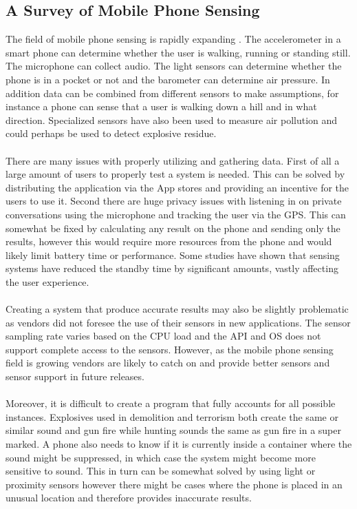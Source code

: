 \subsection{A Survey of Mobile Phone Sensing}

The field of mobile phone sensing is rapidly expanding \cite{mobsurv}. The accelerometer in a smart phone can determine whether the user is walking, running or standing still. The microphone can collect audio. The light sensors can determine whether the phone is in a pocket or not and the barometer can determine air pressure. In addition data can be combined from different sensors to make assumptions, for instance a phone can sense that a user is walking down a hill and in what direction. Specialized sensors have also been used to measure air pollution and could perhaps be used to detect explosive residue.
\\\\
There are many issues with properly utilizing and gathering data. First of all a large amount of users to properly test a system is needed. This can be solved by distributing the application via the App stores and providing an incentive for the users to use it. Second there are huge privacy issues with listening in on private conversations using the microphone and tracking the user via the GPS. This can somewhat be fixed by calculating any result on the phone and sending only the results, however this would require more resources from the phone and would likely limit battery time or performance. Some studies have shown that sensing systems have reduced the standby time by significant amounts, vastly affecting the user experience.
\\\\
Creating a system that produce accurate results may also be slightly problematic as vendors did not foresee the use of their sensors in new applications. The sensor sampling rate varies based on the CPU load and the API and OS does not support complete access to the sensors. However, as the mobile phone sensing field is growing vendors are likely to catch on and provide better sensors and sensor support in future releases.
\\\\
Moreover, it is difficult to create a program that fully accounts for all possible instances. Explosives used in demolition and terrorism both create the same or similar sound and gun fire while hunting sounds the same as gun fire in a super marked. A phone also needs to know if it is currently inside a container where the sound might be suppressed, in which case the system might become more sensitive to sound. This in turn can be somewhat solved by using light or proximity sensors however there might be cases where the phone is placed in an unusual location and therefore provides inaccurate results.

